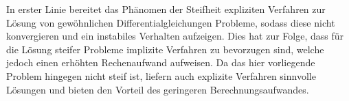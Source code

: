 In erster Linie bereitet das Phänomen der Steifheit expliziten Verfahren zur Lösung von gewöhnlichen Differentialgleichungen Probleme, sodass diese nicht konvergieren und ein instabiles Verhalten aufzeigen. Dies hat zur Folge, dass für die Lösung steifer Probleme implizite Verfahren zu bevorzugen sind, welche jedoch einen erhöhten Rechenaufwand aufweisen.  Da das hier vorliegende Problem hingegen nicht steif ist, liefern auch explizite Verfahren sinnvolle Lösungen und bieten den Vorteil des geringeren Berechnungsaufwandes.
